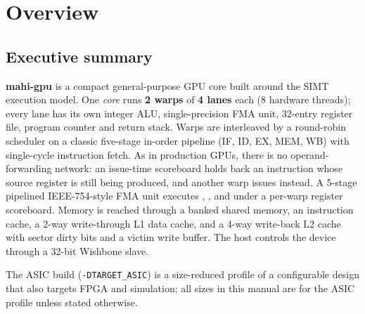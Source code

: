 \documentclass[10pt,a4paper]{report}
\newcommand{\ins}[1]{\texttt{\detokenize{#1}}}
\begin{document}
\tableofcontents
\clearpage
{}

\chapter{Overview}\label{ch:overview}
\section{Executive summary}
\textbf{mahi-gpu} is a compact general-purpose GPU core built around the SIMT execution model. One \emph{core} runs
\textbf{2 warps} of \textbf{4 lanes} each (8 hardware threads); every lane has its own integer ALU, single-precision FMA
unit, 32-entry register file, program counter and return stack. Warps are interleaved by a round-robin scheduler on a
classic five-stage in-order pipeline (IF, ID, EX, MEM, WB) with single-cycle instruction fetch. As in production GPUs, there
is no operand-forwarding network: an issue-time scoreboard holds back an instruction whose source register is still being
produced, and another warp issues instead. A 5-stage pipelined IEEE-754-style FMA unit executes
\ins{FADD}, \ins{FSUB}, \ins{FMUL} and \ins{FMA} under a per-warp register scoreboard.
Memory is reached through a banked shared memory, an instruction cache, a 2-way write-through L1 data cache, and a
4-way write-back L2 cache with sector dirty bits and a victim write buffer. The host controls the device through a
32-bit Wishbone slave.

The ASIC build (\texttt{-DTARGET\_ASIC}) is a size-reduced profile of a configurable design that also targets FPGA and
simulation; all sizes in this manual are for the ASIC profile unless stated otherwise.
\end{document}
